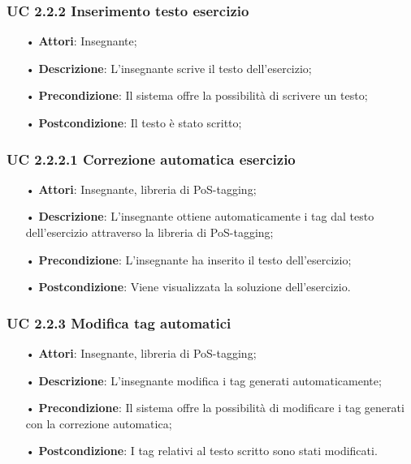 \subsubsection{UC 2.2.2 Inserimento testo esercizio}

\begin{itemize}
	\item[•] \textbf{Attori}: Insegnante;
	\item[•] \textbf{Descrizione}: L'insegnante scrive il testo dell’esercizio;
	\item[•] \textbf{Precondizione}: Il sistema offre la possibilità di scrivere un testo;
	\item[•] \textbf{Postcondizione}: Il testo è stato scritto;
\end{itemize}

\subsubsection{UC 2.2.2.1 Correzione automatica esercizio}
\begin{itemize}
	\item[•] \textbf{Attori}: Insegnante, libreria di {PoS-tagging};
	\item[•] \textbf{Descrizione}: L’insegnante ottiene automaticamente i tag dal testo dell’esercizio attraverso la libreria di PoS-tagging;
	\item[•] \textbf{Precondizione}: L'insegnante ha inserito il testo dell'esercizio;
	\item[•] \textbf{Postcondizione}: Viene visualizzata la soluzione dell'esercizio.
\end{itemize}

\subsubsection{UC 2.2.3 Modifica tag automatici}
\begin{itemize}
	\item[•] \textbf{Attori}: Insegnante, libreria di PoS-tagging;
	\item[•] \textbf{Descrizione}: L’insegnante modifica i tag generati automaticamente;
	\item[•] \textbf{Precondizione}: Il sistema offre la possibilità di modificare i tag generati con la correzione automatica;
	\item[•] \textbf{Postcondizione}: I tag relativi al testo scritto sono stati modificati.
\end{itemize}


